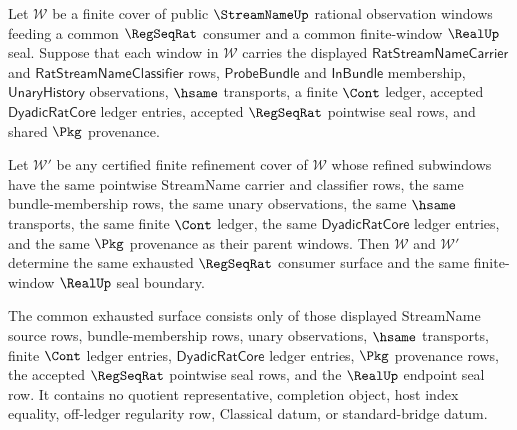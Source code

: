 \begin{theorem}
\label{thm:streamname-regseqrat-finite-window-cover-refinement-exhaustion}
Let $\mathcal{W}$ be a finite cover of public $\StreamNameUp$ rational
observation windows feeding a common $\RegSeqRat$ consumer and a common
finite-window $\RealUp$ seal. Suppose that each window in $\mathcal{W}$ carries
the displayed $\mathsf{RatStreamNameCarrier}$ and
$\mathsf{RatStreamNameClassifier}$ rows, $\mathsf{ProbeBundle}$ and
$\mathsf{InBundle}$ membership, $\mathsf{UnaryHistory}$ observations,
$\hsame$ transports, a finite $\Cont$ ledger, accepted
$\mathsf{DyadicRatCore}$ ledger entries, accepted $\RegSeqRat$ pointwise seal
rows, and shared $\Pkg$ provenance.

Let $\mathcal{W}'$ be any certified finite refinement cover of
$\mathcal{W}$ whose refined subwindows have the same pointwise StreamName
carrier and classifier rows, the same bundle-membership rows, the same unary
observations, the same $\hsame$ transports, the same finite $\Cont$ ledger,
the same $\mathsf{DyadicRatCore}$ ledger entries, and the same $\Pkg$
provenance as their parent windows. Then $\mathcal{W}$ and $\mathcal{W}'$
determine the same exhausted $\RegSeqRat$ consumer surface and the same
finite-window $\RealUp$ seal boundary.

The common exhausted surface consists only of those displayed StreamName
source rows, bundle-membership rows, unary observations, $\hsame$ transports,
finite $\Cont$ ledger entries, $\mathsf{DyadicRatCore}$ ledger entries,
$\Pkg$ provenance rows, the accepted $\RegSeqRat$ pointwise seal rows, and
the $\RealUp$ endpoint seal row. It contains no quotient representative,
completion object, host index equality, off-ledger regularity row,
Classical datum, or standard-bridge datum.
\end{theorem}
